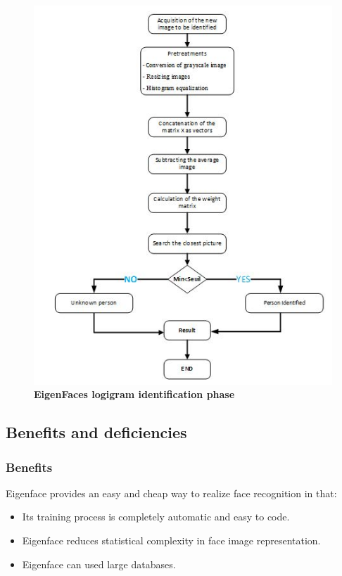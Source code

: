 \begin{figure}[bth]%
\begin{center}
\includegraphics[scale=0.85]{ef_idphase}%
\caption{\textbf{EigenFaces logigram identification phase}}%
\label{ef_idphase}%
\end {center}
\end{figure}	
 \newpage
\subsection{Benefits and deficiencies}	
\subsubsection{Benefits}	
Eigenface provides an easy and cheap way to realize face recognition in that:
\begin{itemize}
\item Its training process is completely automatic and easy to code. 
\item Eigenface reduces statistical complexity in face image representation.
\item Eigenface can used large databases.
\end{itemize}


